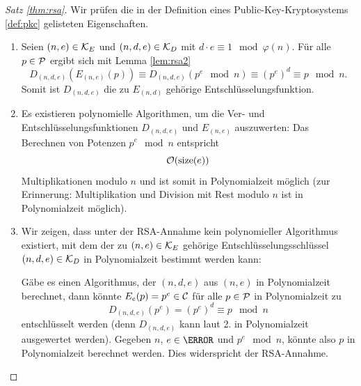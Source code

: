 \begin{proof}[\textnormal{Satz \ref{thm:rsa}}]
Wir prüfen die in der Definition eines Public-Key-Kryptosystems \ref{def:pkc} gelisteten Eigenschaften.
 \begin{enumerate}
  \item Seien $(n, e) \in \mathcal K_E$ und $(n, d, e) \in \mathcal K_D$ mit $d \cdot e \equiv 1 \mod \varphi(n)$. Für alle $p \in \mathcal P$ ergibt sich mit Lemma \ref{lem:rsa2}
 \[D_{(n, d, e)}(E_{(n, e)}(p)) \equiv D_{(n, d, e)}(p^e \mod n) \equiv (p^e)^d  \equiv p \mod n.\]
 Somit ist $D_{(n, d, e)}$ die zu $E_{(n, d)}$ gehörige Entschlüsselungsfunktion. 
 \item Es existieren polynomielle Algorithmen, um die Ver- und Entschlüsselungsfunktionen $D_{(n, d,e )}$ und $E_{(n, e)}$ auszuwerten: Das Berechnen von Potenzen $p^e \mod n$ entspricht \[\mathcal O(\operatorname{size}(e))\] Multiplikationen modulo $n$ und ist somit in Polynomialzeit möglich (zur Erinnerung: Multiplikation und Division mit Rest modulo $n$ ist in Polynomialzeit möglich).
 \item Wir zeigen, dass unter der RSA-Annahme kein polynomieller Algorithmus existiert, mit dem der zu $(n, e) \in \mathcal K_E$ gehörige Entschlüsselungsschlüssel $(n, d, e) \in \mathcal K_D$ in Polynomialzeit bestimmt werden kann: 
 
 Gäbe es einen Algorithmus, der $(n, d, e)$ aus $(n, e)$ in Polynomialzeit berechnet, dann könnte $E_e(p) = p^e \in \mathcal C$ für alle $p \in \mathcal P$ in Polynomialzeit zu 
 \[D_{(n, d, e)}(p^e) = (p^e)^d \equiv p \mod n\]
 entschlüsselt werden (denn $D_{(n, d, e)}$ kann laut 2. in Polynomialzeit ausgewertet werden). Gegeben $n$, $e \in \N$ und $p^e \mod n$, könnte also $p$ in Polynomialzeit berechnet werden. Dies widerspricht der RSA-Annahme.
  \end{enumerate}
\end{proof}


